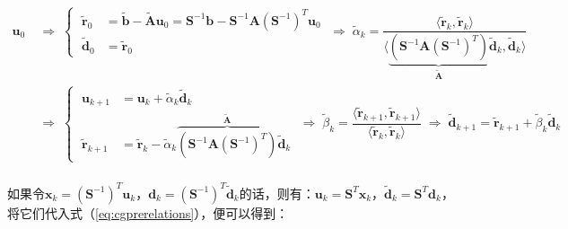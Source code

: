 \documentclass[12pt, UTF8, nofonts]{ctexart}
\begin{document}
\begin{equation}
    \label{eq:cgprerelations}
    \begin{aligned}
        \boldsymbol{u}_0 &\;\Rightarrow \;
        \left\{ \; \begin{aligned}
            \tilde{\boldsymbol{r}}_0 &= \tilde{\boldsymbol{b}}-\tilde{\boldsymbol{A}}\boldsymbol{u}_0 =
            \boldsymbol{S}^{-1}\boldsymbol{b} - \boldsymbol{S}^{-1}\boldsymbol{A}(\boldsymbol{S}^{-1})^T\boldsymbol{u}_0 \\
            \tilde{\boldsymbol{d}}_0 &= \tilde{\boldsymbol{r}}_0
        \end{aligned}\right. \;\Rightarrow\;
        \tilde{\alpha}_k = \dfrac{\Big\langle \tilde{\boldsymbol{r}}_k, \tilde{\boldsymbol{r}}_k \Big\rangle}{\Big\langle \underbrace{\left(\boldsymbol{S}^{-1}\boldsymbol{A}(\boldsymbol{S}^{-1})^T\right)}_{\tilde{\boldsymbol{A}}}\tilde{\boldsymbol{d}}_k , \tilde{\boldsymbol{d}}_k \Big\rangle} \\
        &\;\Rightarrow \;
        \left\{ \; \begin{aligned}
            \boldsymbol{u}_{k+1} &= \boldsymbol{u}_k + \tilde{\alpha}_k\tilde{\boldsymbol{d}}_k \\
            \tilde{\boldsymbol{r}}_{k+1} &= \tilde{\boldsymbol{r}}_k - \tilde{\alpha}_k \overbrace{\left( \boldsymbol{S}^{-1}\boldsymbol{A}(\boldsymbol{S}^{-1})^T \right)}^{\tilde{\boldsymbol{A}}} \tilde{\boldsymbol{d}}_k
        \end{aligned}\right. \;\Rightarrow\;
        \tilde{\beta}_k = \dfrac{\Big\langle \tilde{\boldsymbol{r}}_{k+1}, \tilde{\boldsymbol{r}}_{k+1} \Big\rangle}{\Big\langle \tilde{\boldsymbol{r}}_{k}, \tilde{\boldsymbol{r}}_{k} \Big\rangle} \;\Rightarrow\; \tilde{\boldsymbol{d}}_{k+1} = \tilde{\boldsymbol{r}}_{k+1} + \tilde{\beta}_k\tilde{\boldsymbol{d}}_k \\
    \end{aligned}
\end{equation}

如果令$\boldsymbol{x}_k=(\boldsymbol{S}^{-1})^T\boldsymbol{u}_k$，$\boldsymbol{d}_k=(\boldsymbol{S}^{-1})^T\tilde{\boldsymbol{d}}_k$的话，则有：$\boldsymbol{u}_k=\boldsymbol{S}^T\boldsymbol{x}_k$，$\tilde{\boldsymbol{d}}_k=\boldsymbol{S}^T\boldsymbol{d}_k$，将它们代入式（\ref{eq:cgprerelations}），便可以得到：
\end{document}
